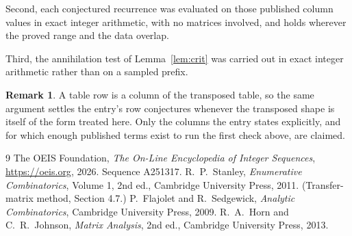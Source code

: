 \documentclass[11pt,a4paper]{article}
\theoremstyle{plain}
\theoremstyle{definition}
\newtheorem{remark}[theorem]{Remark}
\begin{document}
Second, each conjectured recurrence was evaluated on those published column values in exact
integer arithmetic, with no matrices involved, and holds wherever the proved range and the
data overlap.

Third, the annihilation test of Lemma~\ref{lem:crit} was carried out in exact integer
arithmetic rather than on a sampled prefix.

\begin{remark}
A table row is a column of the transposed table, so the same argument settles the entry's row
conjectures whenever the transposed shape is itself of the form treated here. Only the columns
the entry states explicitly, and for which enough published terms exist to run the first check
above, are claimed.
\end{remark}

\begin{thebibliography}{9}
 The OEIS Foundation, \emph{The On-Line Encyclopedia of Integer
Sequences}, \url{https://oeis.org}, 2026. Sequence A251317.
 R.~P.~Stanley, \emph{Enumerative Combinatorics}, Volume 1, 2nd ed.,
Cambridge University Press, 2011. (Transfer-matrix method, Section 4.7.)
 P.~Flajolet and R.~Sedgewick, \emph{Analytic Combinatorics}, Cambridge
University Press, 2009.
 R.~A.~Horn and C.~R.~Johnson, \emph{Matrix Analysis}, 2nd ed., Cambridge
University Press, 2013.
\end{thebibliography}
\end{document}
